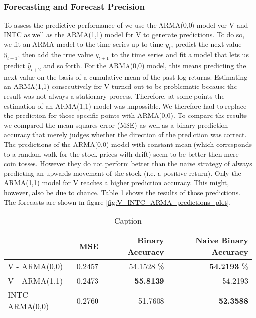 \begin{table}[h!]
    \centering
    
    \caption{}
    \label{tab:INTC_result_GARCH11_students_GJR_100}
\end{table}{}

\subsubsection{Forecasting and Forecast Precision}
To assess the predictive performance of we use the ARMA(0,0) model vor V and INTC as well as the ARMA(1,1) model for V to generate predictions. To do so, we fit an ARMA model to the time series up to time $y_t$, predict the next value $\hat{y}_{t+1}$, then add the true value $y_{t+1}$ to the time series and fit a model that lets us predict $\hat{y}_{t + 2}$ and so forth. For the ARMA(0,0) model, this means predicting the next value on the basis of a cumulative mean of the past log-returns. Estimating an ARMA(1,1) consecutively for V turned out to be problematic because the result was not always a stationary process. Therefore, at some points the estimation of an ARMA(1,1) model was impossible. We therefore had to replace the prediction for those specific points with ARMA(0,0). 
To compare the results we compared the mean squares error (MSE) as well as a binary prediction accuracy that merely judges whether the direction of the prediction was correct. The predictions of the ARMA(0,0) model with constant mean (which corresponds to a random walk for the stock prices with drift) seem to be better then mere coin tosses. However they do not perform better than the naive strategy of always predicting an upwards movement of the stock (i.e. a positive return). Only the ARMA(1,1) model for V reaches a higher prediction accuracy. This might, however, also be due to chance. Table \ref{tab:V_INTC_ARMA_predictions} shows the results of those predictions. The forecasts are shown in figure \ref{fig:V_INTC_ARMA_predictions_plot}. 

\begin{table}[]
    \centering
    \begin{tabular}{lrrr}
    \toprule
    {}  & MSE & Binary Accuracy & Naive Binary Accuracy \\
    \midrule
    V - ARMA(0,0) & 0.2457 & 54.1528 \% & \textbf{54.2193} \% \\
    V - ARMA(1,1) & 0.2473 & \textbf{55.8139} & 54.2193 \\
    INTC - ARMA(0,0) & 0.2760 & 51.7608 & \textbf{52.3588} \\
    \bottomrule
    \end{tabular}
    \caption{Caption}
    \label{tab:V_INTC_ARMA_predictions}
\end{table}{}

